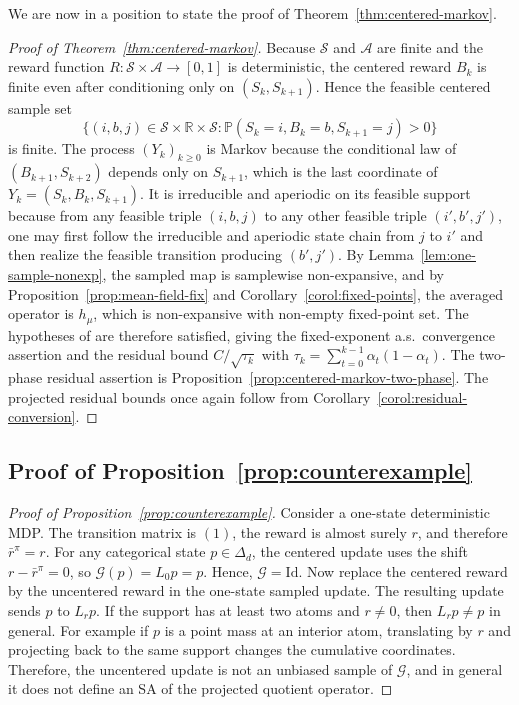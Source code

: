 \documentclass{article}
\newcommand{\X}{\mathcal{S}}
\newcommand{\A}{\mathcal{A}}
\newcommand{\R}{\mathbb{R}}
\begin{document}
We are now in a position to state the proof of Theorem~\ref{thm:centered-markov}.
\begin{proof}[Proof of Theorem~\ref{thm:centered-markov}] 
Because $\X$ and $\A$ are finite and the reward function $R:\X\times\A\to[0,1]$ is deterministic, the centered reward $B_k$ is finite even after conditioning only on $(S_k,S_{k+1})$. Hence the feasible centered sample set
\begin{equation}
\{(i, b,j) \in \X \times \R \times \X: \mathbb P(S_k =i, B_k = b, S_{k+1}=j) >0 \}
\end{equation}
is finite. The process $(Y_k)_{k\ge0}$ is Markov because the conditional law of $(B_{k+1}, S_{k+2})$ depends only on $S_{k+1}$, which is the last coordinate of $Y_k = (S_k, B_k, S_{k+1})$. It is irreducible and aperiodic on its feasible support because from any feasible triple $(i, b,j)$ to any other feasible triple $(i', b', j')$, one may first follow the irreducible and aperiodic state chain from $j$ to $i'$ and then realize the feasible transition producing $(b', j')$. By Lemma~\ref{lem:one-sample-nonexp}, the sampled map is samplewise non-expansive, and by Proposition~\ref{prop:mean-field-fix} and Corollary~\ref{corol:fixed-points}, the averaged operator is $h_\mu$, which is non-expansive with non-empty fixed-point set. The hypotheses of \citet{blaser2026asymptotic} are therefore satisfied, giving the fixed-exponent a.s.\ convergence assertion and the residual bound $C/\sqrt{\tau_k}$ with $\tau_k=\sum_{t=0}^{k-1}\alpha_t(1-\alpha_t)$. The two-phase residual assertion is Proposition~\ref{prop:centered-markov-two-phase}. The projected residual bounds once again follow from Corollary~\ref{corol:residual-conversion}.
\end{proof}

\subsection{Proof of Proposition~\ref{prop:counterexample}}
\begin{proof}[Proof of Proposition~\ref{prop:counterexample}]
Consider a one-state deterministic MDP. The transition matrix is $(1)$, the reward is almost surely $r$, and therefore $\bar r^\pi = r$. For any categorical state $p \in \Delta_d$, the centered update uses the shift $r - \bar r^\pi =0$, so $\mathcal G(p) = L_0 p = p$. Hence, $\mathcal G = \mathrm{Id}$. Now replace the centered reward by the uncentered reward in the one-state sampled update. The resulting update sends $p$ to $L_r p$. If the support has at least two atoms and $r \ne 0$, then $L_r p \ne p$ in general. For example if $p$ is a point mass at an interior atom, translating by $r$ and projecting back to the same support changes the cumulative coordinates. Therefore, the uncentered update is not an unbiased sample of $\mathcal G$, and in general it does not define an SA of the projected quotient operator.
\end{proof}
\end{document}
